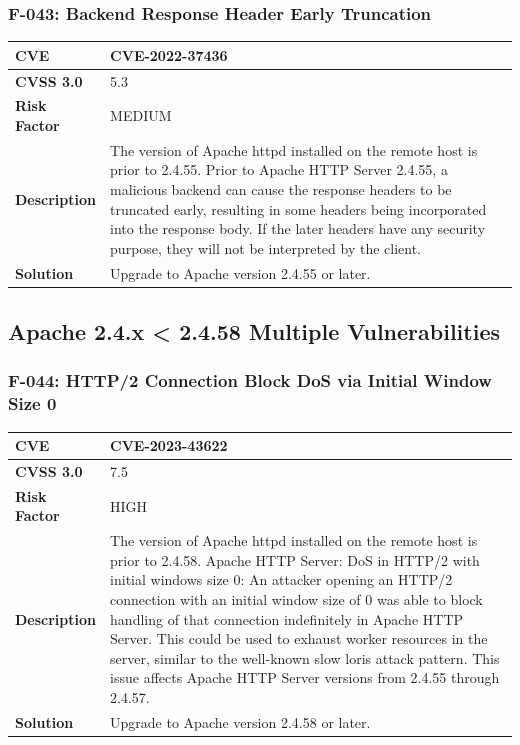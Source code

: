 \subsubsection{F-043: Backend Response Header Early Truncation}
\begin{tabular}{|p{2.8cm}|p{12.2cm}|}
\hline
\textbf{CVE} & CVE-2022-37436 \\ \hline
\textbf{CVSS 3.0} & 5.3 \\ \hline
\textbf{Risk Factor} & MEDIUM \\ \hline
\textbf{Description} & The version of Apache httpd installed on the remote host is prior to 2.4.55. Prior to Apache HTTP Server 2.4.55, a malicious backend can cause the response headers to be truncated early, resulting in some headers being incorporated into the response body. If the later headers have any security purpose, they will not be interpreted by the client. \\ \hline
\textbf{Solution} & Upgrade to Apache version 2.4.55 or later. \\ \hline
\end{tabular}

%
%
\subsection{Apache 2.4.x < 2.4.58 Multiple Vulnerabilities}

\subsubsection{F-044: HTTP/2 Connection Block DoS via Initial Window Size 0}
\begin{tabular}{|p{2.8cm}|p{12.2cm}|}
\hline
\textbf{CVE} & CVE-2023-43622 \\ \hline
\textbf{CVSS 3.0} & 7.5 \\ \hline
\textbf{Risk Factor} & HIGH \\ \hline
\textbf{Description} & The version of Apache httpd installed on the remote host is prior to 2.4.58. Apache HTTP Server: DoS in HTTP/2 with initial windows size 0: An attacker opening an HTTP/2 connection with an initial window size of 0 was able to block handling of that connection indefinitely in Apache HTTP Server. This could be used to exhaust worker resources in the server, similar to the well-known slow loris attack pattern. This issue affects Apache HTTP Server versions from 2.4.55 through 2.4.57. \\ \hline
\textbf{Solution} & Upgrade to Apache version 2.4.58 or later. \\ \hline
\end{tabular}

